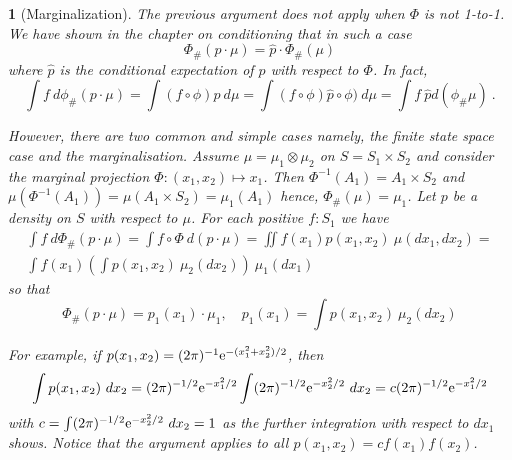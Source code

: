 \documentclass[12pt,a4paper]{amsart}
\theoremstyle{plain}%
\newtheorem{npar}{}%
\theoremstyle{definition}
\theoremstyle{remark}
\begin{document}
\begin{npar}[Marginalization] \normalfont
  The previous argument does not apply when $\Phi$ is not 1-to-1. We have shown in the chapter on conditioning that in such a case
  \begin{equation*}
    \Phi_{\#}(p \cdot \mu) = \hat p \cdot \Phi_{\#}(\mu) 
  \end{equation*}
where $\hat p$ is the conditional expectation of $p$ with respect to
$\Phi$. In fact, 
  \begin{equation*}
    \int f \ d\phi_{\#}(p \cdot \mu) = \int (f\circ \phi) p \ d\mu =
    \int (f\circ \phi) \hat p\circ\phi) \ d\mu = \int f \ \hat p
    d(\phi_{\#}\mu) \ . 
  \end{equation*}

However, there are two common and simple cases namely, the finite state space case and the marginalisation. Assume $\mu = \mu_1 \otimes \mu_2$ on $S = S_1 \times S_2$ and consider the marginal projection $\Phi \colon (x_1,x_2) \mapsto x_1$. Then $\Phi^{-1}(A_1) = A_1 \times S_2$ and $\mu(\Phi^{-1}(A_1)) = \mu(A_1 \times S_2) = \mu_1(A_1)$ hence, $\Phi_{\#}(\mu) = \mu_1$. Let $p$ be a density on $S$ with respect to $\mu$. For each positive $f \colon S_1$ we have
\begin{multline*}
\int f \ d\Phi_{\#} (p \cdot \mu) = \int f\circ\Phi\ d(p \cdot \mu) = \iint f(x_1) p(x_1,x_2) \ \mu(dx_1,dx_2) = \\ \int f(x_1) \left(\int p(x_1,x_2) \ \mu_2(dx_2)\right) \ \mu_1(dx_1)  
\end{multline*}
so that
\begin{equation*}
  \Phi_{\#} (p \cdot \mu) = p_1(x_1) \cdot \mu_1, \quad p_1(x_1) = \int p(x_1,x_2) \ \mu_2(dx_2)
\end{equation*}

For example, if $p(x_1,x_2) = (2\pi)^{-1} \mathrm{e}^{- (x_1^2+x_2^2)/2}$, then
\begin{equation*}
  \int p(x_1,x_2) \ dx_2 = (2\pi)^{-1/2} \mathrm{e}^{- x_1^2/2} \int (2\pi)^{-1/2} \mathrm{e}^{- x_2^2/2} \ dx_2 = c (2\pi)^{-1/2} \mathrm{e}^{- x_1^2/2} 
\end{equation*}
with $c = \int (2\pi)^{-1/2} \mathrm{e}^{-x_2^2/2} \ dx_2 = 1$ as the further integration with respect to $dx_1$ shows. Notice that the argument applies to all $p(x_1,x_2) = c f(x_1) f(x_2)$.  
\end{npar}
\end{document}

